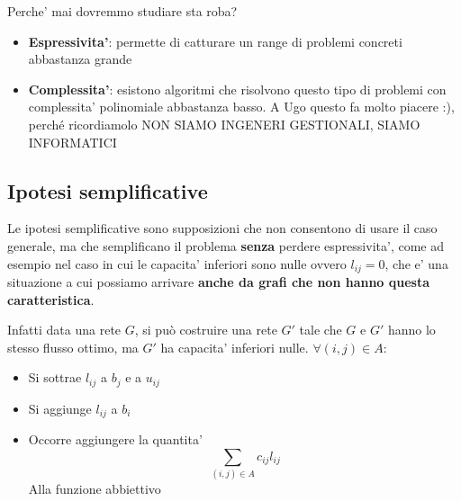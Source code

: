 
Perche' mai dovremmo studiare sta roba? 
\begin{itemize}
\item \textbf{Espressivita'}: permette di catturare un range di problemi concreti abbastanza grande
\item \textbf{Complessita'}: esistono algoritmi che risolvono questo tipo di problemi con complessita' polinomiale abbastanza basso. A Ugo questo fa molto piacere :), perché ricordiamolo NON SIAMO INGENERI GESTIONALI, SIAMO INFORMATICI
\end{itemize}

\subsection{Ipotesi semplificative}

Le ipotesi semplificative sono supposizioni che non consentono di usare il caso generale, ma che semplificano il problema \textbf{senza} perdere espressivita', come ad esempio nel caso in cui le capacita' inferiori sono nulle ovvero $l_{ij}=0$, che e' una situazione a cui possiamo arrivare \textbf{anche da grafi che non hanno questa caratteristica}. 

Infatti data una rete $G$, si può costruire una rete $G'$ tale che $G$ e $G'$ hanno lo stesso flusso ottimo, ma $G'$ ha capacita' inferiori nulle. $\forall (i,j)\in A$:
\begin{itemize}
\item Si sottrae $ l_{ij} $ a $ b_j $ e a $ u_{ij} $
\item Si aggiunge $ l_{ij} $ a $ b_i $
\item Occorre aggiungere la quantita'
  \[
    \sum_{(i,j) \in A} c_{ij}l_{ij}
  \]
  Alla funzione abbiettivo 
\end{itemize}

